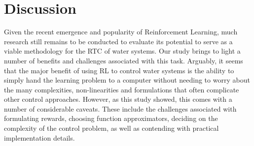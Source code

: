 \section{Discussion}

Given the recent emergence and popularity of Reinforcement Learning, much research still remains to be conducted to evaluate its potential to serve as a viable methodology for the RTC of water systems.
Our study brings to light a number of benefits and challenges associated with this task.
Arguably, it seems that the major benefit of using RL to control water systems is the ability to simply hand the learning problem to a computer without needing to worry about the many complexities, non-linearities and formulations that often complicate other control approaches.
However, as this study showed, this comes with a number of considerable caveats.
These include the challenges associated with formulating rewards, choosing function approximators, deciding on the complexity of the control problem, as well as contending with practical implementation details.

\

